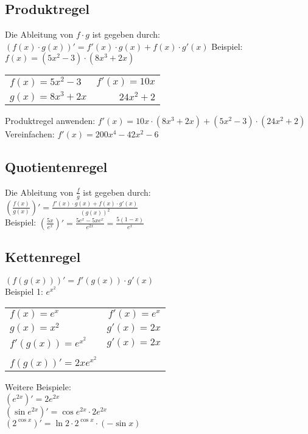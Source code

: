 \documentclass[a4paper, 11pt]{article}
\begin{document}
\subsection{Produktregel}
Die Ableitung von $f \cdot g$ ist gegeben durch: \newline
\newline $(f(x) \cdot g(x))' = f'(x) \cdot g(x) + f(x) \cdot g'(x)$\newline
\newline Beispiel: $f(x) = (5x^2 - 3) \cdot (8x^3+2x)$

\begin{tabular}{l r}
	$f(x) = 5x^2 - 3$ & $f'(x) = 10x$\\
	$g(x)=8x^3+2x$ & $24x^2 + 2$\\
\end{tabular} \newline
\newline Produktregel anwenden: 
\newline $f'(x)=10x \cdot (8x^3+2x) + (5x^2-3) \cdot (24x^2+2)$ \newline
\newline Vereinfachen: $f'(x) = 200x^4-42x^2-6$

\subsection{Quotientenregel}

Die Ableitung von $\frac{f}{g}$ ist gegeben durch: \\
\newline $(\frac{f(x)}{g(x)})' = \frac{f'(x) \cdot g(x) + f(x) \cdot
g'(x)}{(g(x))^2}$ \\

Beispiel: $(\frac{5x}{e^x})' = \frac{5e^x-5xe^x}{e^{2x}} = \frac{5(1-x)}{e^x}$

\subsection{Kettenregel}

$(f(g(x)))' = f'(g(x)) \cdot g'(x)$\\
\newline Beispiel 1: $e^{x^{2}}$\\ 
\begin{tabular}{l r}
	$f(x)=e^x$ & $f'(x)=e^x$\\
	$g(x)=x^2$ & $g'(x)=2x$\\
	$f'(g(x))=e^{x^{2}}$ & $g'(x)=2x$\\
	& \\
	$f(g(x))'=2xe^{x^{2}}$
\end{tabular} \newline
\newline Weitere Beispiele: \\
$(e^{2x})' = 2e^{2x}$\\
$(\sin{e^{2x}})' = \cos{e^{2x}} \cdot 2e^{2x}$\\
$(2^{\cos{x}})'=\ln{2} \cdot 2^{\cos{x}} \cdot (-\sin{x})$
\end{document}
